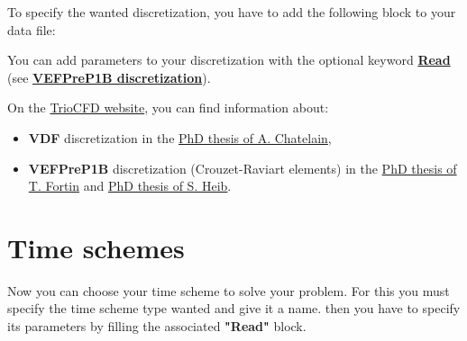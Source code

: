 To specify the wanted discretization, you have to add the following block to your data file:

    \begin{center}
    \end{center}

You can add parameters to your discretization with the optional keyword \href{\REFERENCEMANUAL\#read}{\textbf{Read}} (see \href{\REFERENCEMANUAL\#vefprep1b}{\textbf{VEFPreP1B discretization}}).

On the \href{http://triocfd.cea.fr/}{TrioCFD website}, you can find information about:
\begin{itemize}
\item \textbf{VDF} discretization in the \href{http://triocfd.cea.fr/Documents/DOCS THESES/these_chatelain_2004.pdf}{PhD thesis of A. Chatelain},
\item \textbf{VEFPreP1B} discretization (Crouzet-Raviart elements) in the \href{http://triocfd.cea.fr/Documents/DOCS THESES/these_fortin_2006.pdf}{PhD thesis of T. Fortin} and \href{http://triocfd.cea.fr/Documents/DOCS THESES/These_Heib_2003.pdf}{PhD thesis of S. Heib}.
\end{itemize}


\section{Time schemes}
Now you can choose your time scheme to solve your problem. For this you must
specify the time scheme type wanted and give it a name. 
then you have to specify its parameters by filling the associated \textbf{"Read"} block.

    \begin{center}
    \end{center}

